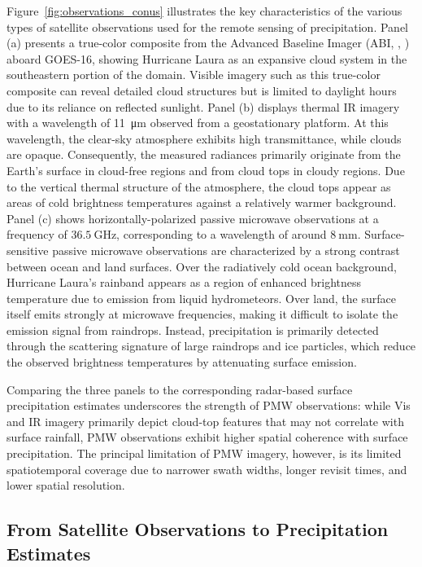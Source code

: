 \documentclass[11pt]{article}
\begin{document}
Figure~\ref{fig:observations_conus} illustrates the key characteristics of the
various types of satellite observations used for the remote sensing of
precipitation. Panel (a) presents a true-color composite from the Advanced
Baseline Imager (ABI, \citeauthor{Schmit2005Introducing},
\citeyear{Schmit2005Introducing}) aboard GOES-16, showing Hurricane Laura as an
expansive cloud system in the southeastern portion of the domain. Visible
imagery such as this true-color composite can reveal detailed cloud structures
but is limited to daylight hours due to its reliance on reflected sunlight.
Panel (b) displays thermal IR imagery with a wavelength of
\SI{11}{\micro \meter} observed from a geostationary platform. At this
wavelength, the clear-sky atmosphere exhibits high transmittance, while clouds
are opaque. Consequently, the measured radiances primarily originate from the
Earth’s surface in cloud-free regions and from cloud tops in cloudy regions. Due
to the vertical thermal structure of the atmosphere, the cloud tops appear as
areas of cold brightness temperatures against a relatively warmer background.
Panel (c) shows horizontally-polarized passive microwave observations at a
frequency of $\SI{36.5}{\giga \hertz}$, corresponding to a wavelength of around
$\SI{8}{\milli \meter}$. Surface-sensitive passive microwave observations are
characterized by a strong contrast between ocean and land surfaces. Over the
radiatively cold ocean background, Hurricane Laura's rainband appears as a
region of enhanced brightness temperature due to emission from liquid
hydrometeors. Over land, the surface itself emits strongly at microwave
frequencies, making it difficult to isolate the emission signal from raindrops.
Instead, precipitation is primarily detected through the scattering signature of
large raindrops and ice particles, which reduce the observed brightness
temperatures by attenuating surface emission.

Comparing the three panels to the corresponding radar-based surface
precipitation estimates underscores the strength of PMW
observations: while Vis and IR imagery primarily depict cloud-top features
that may not correlate with surface rainfall, PMW observations exhibit
higher spatial coherence with surface precipitation. The principal limitation of
PMW imagery, however, is its limited spatiotemporal coverage due
to narrower swath widths, longer revisit times, and lower spatial resolution.

\subsection{From Satellite Observations to Precipitation Estimates}
\end{document}
